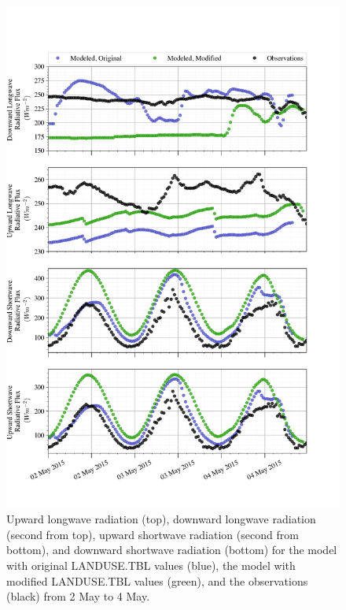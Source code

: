 \begin{figure}[p]
    \centering
    \vspace{-10em}
    \includegraphics[width=1\linewidth]{figures/chapter6/case2_lw_sw.png}
    \caption[Idealized Case 2 - Longwave radiation.]{Upward longwave radiation (top), downward longwave radiation (second from top), upward shortwave radiation (second from bottom), and downward shortwave radiation (bottom) for the model with original LANDUSE.TBL values (blue), the model with modified LANDUSE.TBL values (green), and the observations (black) from 2 May to 4 May.}      
    \label{fig:c2:radiative}
\end{figure}

